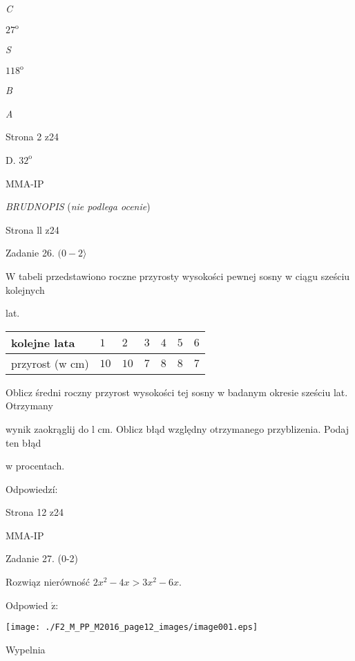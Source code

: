 \documentclass[a4paper,12pt]{article}
\begin{document}
{\it C}

$27^{\mathrm{o}}$

{\it S}

$118^{\mathrm{o}}$

{\it B}

{\it A}

Strona 2 z24

D. $32^{\mathrm{o}}$

MMA-IP





{\it BRUDNOPIS} ({\it nie podlega ocenie})

Strona ll z24





Zadanie 26. $(0-2\rangle$

$\mathrm{W}$ tabeli przedstawiono roczne przyrosty wysokości pewnej sosny w ciągu sześciu kolejnych

lat.
\begin{center}
\begin{tabular}{|l|l|l|l|l|l|l|}
\hline
\multicolumn{1}{|l|}{kolejne lata}&	\multicolumn{1}{|l|}{$1$}&	\multicolumn{1}{|l|}{ $2$}&	\multicolumn{1}{|l|}{ $3$}&	\multicolumn{1}{|l|}{ $4$}&	\multicolumn{1}{|l|}{ $5$}&	\multicolumn{1}{|l|}{ $6$}	\\
\hline
\multicolumn{1}{|l|}{przyrost (w cm)}&	\multicolumn{1}{|l|}{$10$}&	\multicolumn{1}{|l|}{ $10$}&	\multicolumn{1}{|l|}{ $7$}&	\multicolumn{1}{|l|}{ $8$}&	\multicolumn{1}{|l|}{ $8$}&	\multicolumn{1}{|l|}{ $7$}	\\
\hline
\end{tabular}

\end{center}
Oblicz średni roczny przyrost wysokości tej sosny w badanym okresie sześciu lat. Otrzymany

wynik zaokrąglij do l cm. Oblicz błąd względny otrzymanego przyblizenia. Podaj ten błąd

w procentach.

Odpowiedzí:

Strona 12 z24

MMA-IP





Zadanie 27. (0-2)

Rozwiąz nierówność $2x^{2}-4x>3x^{2}-6x.$

Odpowied $\acute{\mathrm{z}}$:
\begin{center}
\texttt{[image: ./F2\_M\_PP\_M2016\_page12\_images/image001.eps]}
\end{center}
Wypelnia
\end{document}
